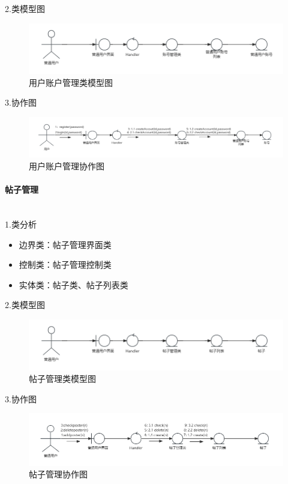\documentclass[UTF8]{ctexart}
\newcommand{\subsubsubsection}[1]{\paragraph{#1}\mbox{}\\} %
\begin{document}
2.类模型图

\begin{figure}[H]
  \centering
  \includegraphics[scale=0.3]{类图/用户账号.png}
  \caption{用户账户管理类模型图}
\end{figure}
3.协作图

\begin{figure}[H]
  \centering
  \includegraphics[scale=0.3]{协作图/用户账号.png}
  \caption{用户账户管理协作图}
\end{figure}



\subsubsubsection{帖子管理}

1.类分析
\begin{itemize}
  \item 边界类：帖子管理界面类
  \item 控制类：帖子管理控制类
  \item 实体类：帖子类、帖子列表类
\end{itemize}

2.类模型图

\begin{figure}[H]
  \centering
  \includegraphics[scale=0.3]{类图/用户帖子管理.png}
  \caption{帖子管理类模型图}
\end{figure}


3.协作图

\begin{figure}[H]
  \centering
  \includegraphics[scale=0.3]{协作图/用户帖子.png}
  \caption{帖子管理协作图}
\end{figure}
\end{document}
